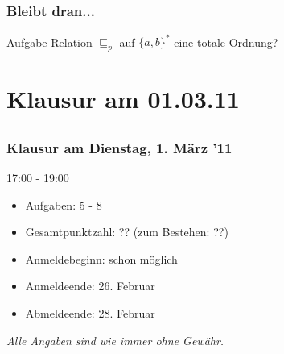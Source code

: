 \subsection*{}
\begin{frame}
  \frametitle{Bleibt dran...}

	\begin{block}{Aufgabe}
		Relation $\sqsubseteq_p$ auf $ \{a, b\}^* $ eine totale Ordnung?
	\end{block}
\end{frame}

\section[Klausur]{Klausur am 01.03.11}
\subsection*{}
\begin{frame}
	\frametitle{Klausur am Dienstag, 1. März '11}
	\begin{block}{17:00 - 19:00}
		\begin{itemize}
			\item Aufgaben: 5 - 8
			\item Gesamtpunktzahl: ?? (zum Bestehen: ??)
			\item Anmeldebeginn: schon möglich
			\item Anmeldeende: 26. Februar
			\item Abmeldeende: 28. Februar
		\end{itemize}
  	\end{block}
  	\textit{Alle Angaben sind wie immer ohne Gewähr.}
\end{frame}


